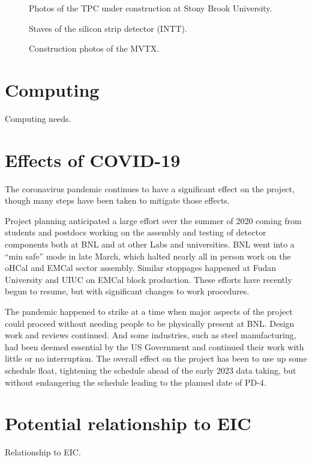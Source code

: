 \begin{figure}[!hbt]
 \begin{center}
        \caption{\label{fig:tpc}Photos of the TPC under construction
        at Stony Brook University.}
 \end{center}
\end{figure}

\begin{figure}[!hbt]
 \begin{center}
        \caption{\label{fig:intt}Staves of the silicon strip detector (INTT).}
 \end{center}
\end{figure}

\begin{figure}[!hbt]
 \begin{center}
        \caption{\label{fig:mvtx}Construction photos of the MVTX.}
 \end{center}
\end{figure}


\section{Computing}
\label{sec:computing}

Computing needs.

\section{Effects of COVID-19}
\label{sec:covid}

The coronavirus pandemic continues to have a significant effect on the
project, though many steps have been taken to mitigate those
effects.

Project planning anticipated a large effort over the summer of 2020
coming from students and postdocs working on the assembly and testing
of detector components both at BNL and at other Labs and universities.
BNL went into a ``min safe'' mode in late March, which halted nearly
all in person work on the oHCal and EMCal sector assembly.  Similar
stoppages happened at Fudan University and UIUC on EMCal block
production.  These efforts have recently begun to resume, but with
significant changes to work procedures.

The pandemic happened to strike at a time when major aspects of the
project could proceed without needing people to be physically present
at BNL.  Design work and reviews continued.  And some industries, such
as steel manufacturing, had been deemed essential by the US Government
and continued their work with little or no interruption.  The overall
effect on the project has been to use up some schedule float,
tightening the schedule ahead of the early 2023 data taking, but
without endangering the schedule leading to the planned date of PD-4.


\section{Potential relationship to EIC}
\label{sec:eic}

Relationship to EIC.

